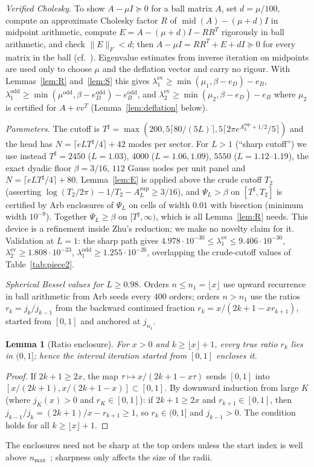 \documentclass[11pt]{amsart}
\newcommand{\ev}{\mathrm{ev}}
\newcommand{\od}{\mathrm{odd}}
\newcommand{\Tsh}{T^{\sharp}}
\newcommand{\e}[1]{\cdot 10^{#1}}
\newtheorem{lemma}[theorem]{Lemma}
\theoremstyle{definition}
\theoremstyle{remark}
\numberwithin{equation}{section}
\begin{document}
\emph{Verified Cholesky.} To show $A-\mu I\succeq0$ for a ball matrix $A$, set $d=\mu/100$, compute an approximate Cholesky factor $R$ of $\operatorname{mid}(A)-(\mu+d)I$ in midpoint arithmetic, compute $E=A-(\mu+d)I-RR^T$ rigorously in ball arithmetic, and check $\|E\|_F<d$; then $A-\mu I=RR^T+E+dI\succeq0$ for every matrix in the ball (cf.~\cite{Rump}). Eigenvalue estimates from inverse iteration on midpoints are used only to choose $\mu$ and the deflation vector and carry no rigour. With Lemmas~\ref{lem:R} and~\ref{lem:S} this gives $\lambda_1^\ev\ge\min(\mu_1,\beta-e_D)-e_B$, $\lambda_1^\od\ge\min(\mu^\od,\beta-e_D^\od)-e_B^\od$, and $\lambda_2^\ev\ge\min(\mu_2,\beta-e_D)-e_B$ where $\mu_2$ is certified for $A+vv^T$ (Lemma~\ref{lem:deflation} below).

\emph{Parameters.} The cutoff is $\Tsh=\max(200,5\lceil80/(5L)\rceil,5\lceil2\pi e^{A_L^{\sup}+1/2}/5\rceil)$ and the head has $N=\lceil eL\Tsh/4\rceil+42$ modes per sector. For $L>1$ (``sharp cutoff'') we use instead $\Tsh=2450$ ($L=1.03$), $4000$ ($L=1.06,1.09$), $5550$ ($L=1.12$--$1.19$), the exact dyadic floor $\beta=3/16$, $112$ Gauss nodes per unit panel and $N=\lceil eL\Tsh/4\rceil+80$. Lemma~\ref{lem:E} is applied above the crude cutoff $T_2$ (asserting $\log(T_2/2\pi)-1/T_2-A_L^{\sup}\ge3/16$), and $\Psi_L>\beta$ on $[\Tsh,T_2]$ is certified by Arb enclosures of $\Psi_L$ on cells of width $0.01$ with bisection (minimum width $10^{-9}$). Together $\Psi_L\ge\beta$ on $[\Tsh,\infty)$, which is all Lemma~\ref{lem:R} needs. This device is a refinement inside Zhu's reduction; we make no novelty claim for it. Validation at $L=1$: the sharp path gives $4.978\e{-30}\le\lambda_1^\ev\le9.406\e{-30}$, $\lambda_2^\ev\ge1.808\e{-23}$, $\lambda_1^\od\ge1.255\e{-26}$, overlapping the crude-cutoff values of Table~\ref{tab:piece2}.

\emph{Spherical Bessel values for $L\ge0.98$.} Orders $n\le n_1=\lfloor x\rfloor$ use upward recurrence in ball arithmetic from Arb seeds every $400$ orders; orders $n>n_1$ use the ratios $r_k=j_k/j_{k-1}$ from the backward continued fraction $r_k=x/(2k+1-xr_{k+1})$, started from $[0,1]$ and anchored at $j_{n_1}$.

\begin{lemma}[Ratio enclosure]\label{lem:ratio}
For $x>0$ and $k\ge\lfloor x\rfloor+1$, every true ratio $r_k$ lies in $(0,1]$; hence the interval iteration started from $[0,1]$ encloses it.
\end{lemma}
\begin{proof}
If $2k+1\ge2x$, the map $\tau\mapsto x/(2k+1-x\tau)$ sends $[0,1]$ into $[x/(2k+1),x/(2k+1-x)]\subset[0,1]$. By downward induction from large $K$ (where $j_K(x)>0$ and $r_K\in[0,1]$): if $2k+1\ge2x$ and $r_{k+1}\in[0,1]$, then $j_{k-1}/j_k=(2k+1)/x-r_{k+1}\ge1$, so $r_k\in(0,1]$ and $j_{k-1}>0$. The condition holds for all $k\ge\lfloor x\rfloor+1$.
\end{proof}
The enclosures need not be sharp at the top orders unless the start index is well above $n_{\max}$~\cite{Gautschi}; sharpness only affects the size of the radii.
\end{document}
